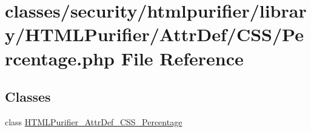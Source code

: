 \hypertarget{Percentage_8php}{\section{classes/security/htmlpurifier/library/\+H\+T\+M\+L\+Purifier/\+Attr\+Def/\+C\+S\+S/\+Percentage.php File Reference}
\label{Percentage_8php}
}
\subsection*{Classes}
\begin{DoxyCompactItemize}
\item 
class \hyperlink{classHTMLPurifier__AttrDef__CSS__Percentage}{H\+T\+M\+L\+Purifier\+\_\+\+Attr\+Def\+\_\+\+C\+S\+S\+\_\+\+Percentage}
\end{DoxyCompactItemize}
